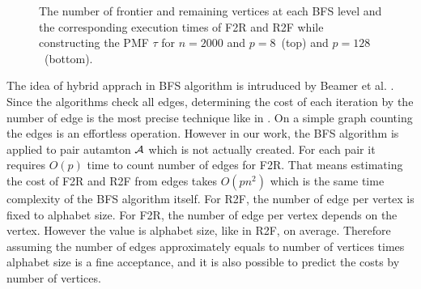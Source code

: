 \documentclass[12pt]{article}
\newcommand{\comment}[2]{{\color{red}{\bf (#1: #2)}}}
\begin{document}
\begin{figure}[ht]
{}
\caption{The number of frontier and remaining vertices at each BFS level and the corresponding execution times of F2R and R2F while constructing the PMF $\tau$ for $n = 2000$ and $p = 8$~(top) and $p=128$~(bottom). 
\comment{sertac}{sayilardaki virguller nokta olmali.}%
}
\label{fig:BFS-vtcomparison}
\vspace*{-3ex}
\end{figure}

The idea of hybrid apprach in BFS algorithm is intruduced by Beamer et al. \cite{Beamer}. Since the algorithms check all edges, determining the cost of each iteration by the number of edge is the most precise technique like in \cite{Beamer}. On a simple graph counting the edges is an effortless operation. However in our work, the BFS algorithm is applied to pair autamton ${\cal A}$ which is not actually created. For each pair it requires $O(p)$ time to count number of edges for F2R. That means estimating the cost of F2R and R2F from edges takes $O(pn^2)$ which is the same time complexity of the BFS algorithm itself. For R2F, the number of edge per vertex is fixed to alphabet size. For F2R, the number of edge per vertex depends on the vertex. However the value is alphabet size, like in R2F, on average. Therefore assuming the number of edges approximately equals to number of vertices times alphabet size is a fine acceptance, and it is also possible to predict the costs by number of vertices.
\end{document}
